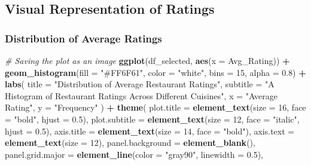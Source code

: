 \documentclass[
]{article}
\newenvironment{Shaded}{\begin{snugshade}}{\end{snugshade}}
\newcommand{\AttributeTok}[1]{\textcolor[rgb]{0.13,0.29,0.53}{#1}}
\newcommand{\CommentTok}[1]{\textcolor[rgb]{0.56,0.35,0.01}{\textit{#1}}}
\newcommand{\DecValTok}[1]{\textcolor[rgb]{0.00,0.00,0.81}{#1}}
\newcommand{\FloatTok}[1]{\textcolor[rgb]{0.00,0.00,0.81}{#1}}
\newcommand{\FunctionTok}[1]{\textcolor[rgb]{0.13,0.29,0.53}{\textbf{#1}}}
\newcommand{\NormalTok}[1]{#1}
\newcommand{\SpecialCharTok}[1]{\textcolor[rgb]{0.81,0.36,0.00}{\textbf{#1}}}
\newcommand{\StringTok}[1]{\textcolor[rgb]{0.31,0.60,0.02}{#1}}
\begin{document}
\subsection{Visual Representation of
Ratings}\label{visual-representation-of-ratings}

\subsubsection{Distribution of Average
Ratings}\label{distribution-of-average-ratings}

\begin{Shaded}
\begin{Highlighting}[]
\CommentTok{\# Saving the plot as an image}
\FunctionTok{ggplot}\NormalTok{(df\_selected, }\FunctionTok{aes}\NormalTok{(}\AttributeTok{x =}\NormalTok{ Avg\_Rating)) }\SpecialCharTok{+}
  \FunctionTok{geom\_histogram}\NormalTok{(}\AttributeTok{fill =} \StringTok{"\#FF6F61"}\NormalTok{, }\AttributeTok{color =} \StringTok{"white"}\NormalTok{, }\AttributeTok{bins =} \DecValTok{15}\NormalTok{, }\AttributeTok{alpha =} \FloatTok{0.8}\NormalTok{) }\SpecialCharTok{+} 
  \FunctionTok{labs}\NormalTok{(}
    \AttributeTok{title =} \StringTok{"Distribution of Average Restaurant Ratings"}\NormalTok{,}
    \AttributeTok{subtitle =} \StringTok{"A Histogram of Restaurant Ratings Across Different Cuisines"}\NormalTok{,}
    \AttributeTok{x =} \StringTok{"Average Rating"}\NormalTok{, }
    \AttributeTok{y =} \StringTok{"Frequency"}
\NormalTok{  ) }\SpecialCharTok{+}
  \FunctionTok{theme}\NormalTok{(}
    \AttributeTok{plot.title =} \FunctionTok{element\_text}\NormalTok{(}\AttributeTok{size =} \DecValTok{16}\NormalTok{, }\AttributeTok{face =} \StringTok{"bold"}\NormalTok{, }\AttributeTok{hjust =} \FloatTok{0.5}\NormalTok{),}
    \AttributeTok{plot.subtitle =} \FunctionTok{element\_text}\NormalTok{(}\AttributeTok{size =} \DecValTok{12}\NormalTok{, }\AttributeTok{face =} \StringTok{"italic"}\NormalTok{, }\AttributeTok{hjust =} \FloatTok{0.5}\NormalTok{),}
    \AttributeTok{axis.title =} \FunctionTok{element\_text}\NormalTok{(}\AttributeTok{size =} \DecValTok{14}\NormalTok{, }\AttributeTok{face =} \StringTok{"bold"}\NormalTok{),}
    \AttributeTok{axis.text =} \FunctionTok{element\_text}\NormalTok{(}\AttributeTok{size =} \DecValTok{12}\NormalTok{),}
    \AttributeTok{panel.background =} \FunctionTok{element\_blank}\NormalTok{(),}
    \AttributeTok{panel.grid.major =} \FunctionTok{element\_line}\NormalTok{(}\AttributeTok{color =} \StringTok{"gray90"}\NormalTok{, }\AttributeTok{linewidth =} \FloatTok{0.5}\NormalTok{),}

\end{Highlighting}
\end{Shaded}
\end{document}
